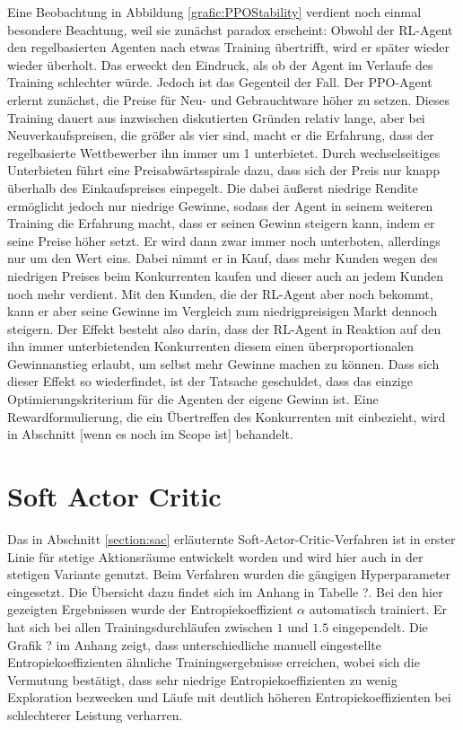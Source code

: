 Eine Beobachtung in Abbildung \ref{grafic:PPOStability} verdient noch einmal besondere Beachtung, weil sie zunächst paradox erscheint:
Obwohl der RL-Agent den regelbasierten Agenten nach etwas Training übertrifft, wird er später wieder wieder überholt.
Das erweckt den Eindruck, als ob der Agent im Verlaufe des Training schlechter würde.
Jedoch ist das Gegenteil der Fall.
Der PPO-Agent erlernt zunächst, die Preise für Neu- und Gebrauchtware höher zu setzen.
Dieses Training dauert aus inzwischen diskutierten Gründen relativ lange, aber bei Neuverkaufspreisen, die größer als vier sind, macht er die Erfahrung, dass der regelbasierte Wettbewerber ihn immer um 1 unterbietet.
Durch wechselseitiges Unterbieten führt eine Preisabwärtsspirale dazu, dass sich der Preis nur knapp überhalb des Einkaufspreises einpegelt.
Die dabei äußerst niedrige Rendite ermöglicht jedoch nur niedrige Gewinne, sodass der Agent in seinem weiteren Training die Erfahrung macht, dass er seinen Gewinn steigern kann, indem er seine Preise höher setzt.
Er wird dann zwar immer noch unterboten, allerdings nur um den Wert eins.
Dabei nimmt er in Kauf, dass mehr Kunden wegen des niedrigen Preises beim Konkurrenten kaufen und dieser auch an jedem Kunden noch mehr verdient.
Mit den Kunden, die der RL-Agent aber noch bekommt, kann er aber seine Gewinne im Vergleich zum niedrigpreisigen Markt dennoch steigern.
Der Effekt besteht also darin, dass der RL-Agent in Reaktion auf den ihn immer unterbietenden Konkurrenten diesem einen überproportionalen Gewinnanstieg erlaubt, um selbst mehr Gewinne machen zu können.
Dass sich dieser Effekt so wiederfindet, ist der Tatsache geschuldet, dass das einzige Optimierungskriterium für die Agenten der eigene Gewinn ist.
Eine Rewardformulierung, die ein Übertreffen des Konkurrenten mit einbezieht, wird in Abschnitt [wenn es noch im Scope ist] behandelt.

\section{Soft Actor Critic}
\label{section:main_sac}
Das in Abschnitt \ref{section:sac} erläuternte Soft-Actor-Critic-Verfahren ist in erster Linie für stetige Aktionsräume entwickelt worden und wird hier auch in der stetigen Variante genutzt.
Beim Verfahren wurden die gängigen Hyperparameter eingesetzt.
Die Übersicht dazu findet sich im Anhang in Tabelle ?.
Bei den hier gezeigten Ergebnissen wurde der Entropiekoeffizient $\alpha$ automatisch trainiert.
Er hat sich bei allen Trainingsdurchläufen zwischen $1$ und $1.5$ eingependelt.
Die Grafik ? im Anhang zeigt, dass unterschiedliche manuell eingestellte Entropiekoeffizienten ähnliche Trainingsergebnisse erreichen, wobei sich die Vermutung bestätigt, dass sehr niedrige Entropiekoeffizienten zu wenig Exploration bezwecken und Läufe mit deutlich höheren Entropiekoeffizienten bei schlechterer Leistung verharren.

